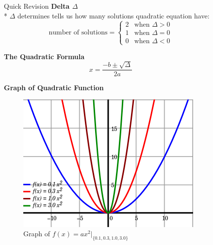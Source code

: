 \documentclass[final]{beamer}
\newlength{\sepwid}
\newlength{\onecolwid}
\newlength{\twocolwid}
\begin{document}
\begin{frame}[t]
\begin{columns}[t]
\begin{column}{\onecolwid}
\begin{block}{Quick Revision}
\textbf{Delta $\Delta$}\\*
$\Delta$ determines tells us how many solutions quadratic equation have:
$$\text{number of solutions}=
\begin{cases}
2 &\text{when } \Delta > 0\\
1 &\text{when } \Delta = 0\\
0 &\text{when } \Delta < 0
\end{cases}
$$


\textbf{The Quadratic Formula}
$$x = \frac{-b\pm \sqrt{\Delta}}{2a}$$

\textbf{Graph of Quadratic Function}

\end{block}


\begin{figure}
\includegraphics[width=0.8\linewidth]{1.jpg}
\caption{Graph of $f(x)=ax^2|_{\{0.1, 0.3, 1.0, 3.0\}}$}
\end{figure}


\end{column} %

\begin{column}{\sepwid}\end{column} %

\begin{column}{\twocolwid} %

\begin{columns}[t,totalwidth=\twocolwid] %


\end{columns}
\end{column}
\end{columns}
\end{frame}
\end{document}
